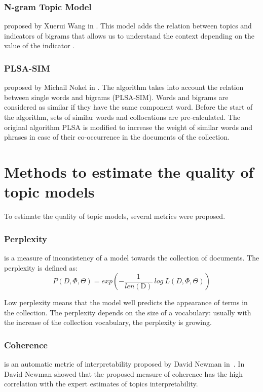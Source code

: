 \documentclass[runningheads,a4paper]{llncs}
\begin{document}
	\subsubsection{N-gram Topic Model} proposed by Xuerui Wang in \cite{wang2007topical}.  This model adds the relation between topics and indicators of bigrams that allows us to understand the context depending on the value of the indicator \cite{wang2007topical}.
	
	\subsubsection{PLSA-SIM} proposed by Michail Nokel in \cite{nokel2015topic}. The algorithm takes into account the relation between single words and bigrams (PLSA-SIM). Words and bigrams are considered as similar if they have the same component word. Before the start of the algorithm, sets of  similar words and collocations are pre-calculated. The original algorithm PLSA is modified to increase the weight of similar words and phrases in case of their co-occurrence in the documents of the collection. 
	
	\section{Methods to estimate the quality of topic models}
	To estimate the quality of topic models, several metrics were proposed.
	
	\subsubsection*{Perplexity} is a measure of inconsistency of a model towards the collection of documents. The perplexity is defined as:
	\begin{equation}
	P(D, \Phi, \Theta) = exp\left( -\frac{1}{len(\textrm{D})}~log~L(D, \Phi, \Theta) \right)
	\label{perp}
	\end{equation}
	
	Low perplexity means that the model well predicts the appearance of terms in the collection. The perplexity depends on the size of a vocabulary: usually with the increase of the collection vocabulary, the perplexity is growing.
	
	\subsubsection*{Coherence} is an automatic metric of interpretability proposed by David Newman in~\cite{newman2010automatic}. In  \cite{newman2010automatic} David Newman showed that the proposed measure of coherence has the high correlation with the expert estimates of topics interpretability. 
	
\end{document}
